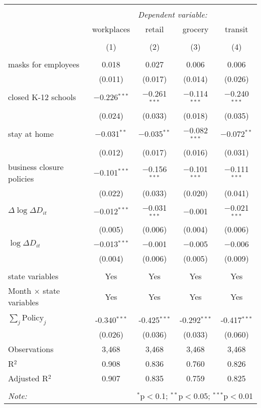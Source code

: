 \begin{tabular}{@{\extracolsep{1pt}}lcccc} 
\\[-1.8ex]\hline 
\hline \\[-1.8ex] 
 & \multicolumn{4}{c}{\textit{Dependent variable:}} \\ 
\cline{2-5} 
 & workplaces & retail & grocery & transit \\ 
\\[-1.8ex] & (1) & (2) & (3) & (4)\\ 
\hline \\[-1.8ex] 
 masks for employees & 0.018 & 0.027 & 0.006 & 0.006 \\ 
  & (0.011) & (0.017) & (0.014) & (0.026) \\ 
  closed K-12 schools & $-$0.226$^{***}$ & $-$0.261$^{***}$ & $-$0.114$^{***}$ & $-$0.240$^{***}$ \\ 
  & (0.024) & (0.033) & (0.018) & (0.035) \\ 
  stay at home & $-$0.031$^{**}$ & $-$0.035$^{**}$ & $-$0.082$^{***}$ & $-$0.072$^{**}$ \\ 
  & (0.012) & (0.017) & (0.016) & (0.031) \\ 
  business closure policies & $-$0.101$^{***}$ & $-$0.156$^{***}$ & $-$0.101$^{***}$ & $-$0.111$^{***}$ \\ 
  & (0.022) & (0.033) & (0.020) & (0.041) \\ 
  $\Delta \log \Delta D_{it}$ & $-$0.012$^{***}$ & $-$0.031$^{***}$ & $-$0.001 & $-$0.021$^{***}$ \\ 
  & (0.005) & (0.006) & (0.004) & (0.006) \\ 
  $\log \Delta D_{it}$ & $-$0.013$^{***}$ & $-$0.001 & $-$0.005 & $-$0.006 \\ 
  & (0.004) & (0.006) & (0.005) & (0.009) \\ 
 \hline \\[-1.8ex] 
state variables & Yes & Yes & Yes & Yes \\ 
Month $\times$ state variables & Yes & Yes & Yes & Yes \\ 
\hline \\[-1.8ex] 
$\sum_j \mathrm{Policy}_j$ & -0.340$^{***}$ & -0.425$^{***}$ & -0.292$^{***}$ & -0.417$^{***}$ \\ 
 & (0.026) & (0.036) & (0.033) & (0.060) \\ 
Observations & 3,468 & 3,468 & 3,468 & 3,468 \\ 
R$^{2}$ & 0.908 & 0.836 & 0.760 & 0.826 \\ 
Adjusted R$^{2}$ & 0.907 & 0.835 & 0.759 & 0.825 \\ 
\hline 
\hline \\[-1.8ex] 
\textit{Note:}  & \multicolumn{4}{r}{$^{*}$p$<$0.1; $^{**}$p$<$0.05; $^{***}$p$<$0.01} \\ 
\end{tabular} 